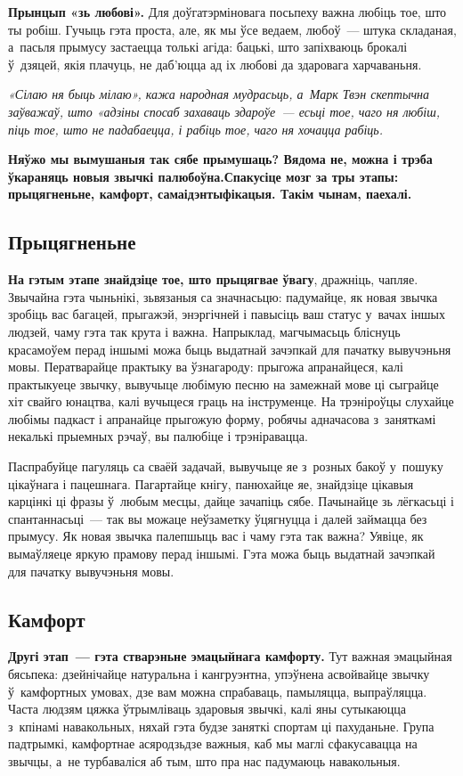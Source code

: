 \textbf{Прынцып «зь любові».} Для доўгатэрміновага посьпеху важна любіць тое, што ты робіш. Гучыць гэта проста, але, як мы ўсе ведаем, любоў~--- штука складаная, а~пасьля прымусу застаецца толькі агіда: бацькі, што запіхваюць брокалі ў~дзяцей, якія плачуць, не даб'юцца ад іх любові да здаровага харчаваньня.

\emph{«Сілаю ня быць мілаю», кажа народная мудрасьць, а~Марк Твэн скептычна заўважаў, што «адзіны спосаб захаваць здароўе~--- есьці тое, чаго ня любіш, піць тое, што не падабаецца, і рабіць тое, чаго ня хочацца рабіць.}

\textbf{Няўжо мы вымушаныя так сябе прымушаць? Вядома не, можна і трэба ўкараняць новыя звычкі палюбоўна.Спакусіце мозг за тры этапы: прыцягненьне, камфорт, самаідэнтыфікацыя. Такім чынам, паехалі.}

\subsection*{Прыцягненьне}

\textbf{На гэтым этапе знайдзіце тое, што прыцягвае ўвагу}, дражніць, чапляе. Звычайна гэта чыньнікі, зьвязаныя са значнасьцю: падумайце, як новая звычка зробіць вас багацей, прыгажэй, энэргічней і павысіць ваш статус у~вачах іншых людзей, чаму гэта так крута і важна. Напрыклад, магчымасьць бліснуць красамоўем перад іншымі можа быць выдатнай зачэпкай для пачатку вывучэньня мовы. Ператварайце практыку ва ўзнагароду: прыгожа апранайцеся, калі практыкуеце звычку, вывучыце любімую песню на замежнай мове ці сыграйце хіт свайго юнацтва, калі вучыцеся граць на інструменце. На трэніроўцы слухайце любімы падкаст і апранайце прыгожую форму, робячы адначасова з~заняткамі некалькі прыемных рэчаў, вы палюбіце і трэніравацца.

Паспрабуйце пагуляць са сваёй задачай, вывучыце яе з~розных бакоў у~пошуку цікаўнага і пацешнага. Пагартайце кнігу, панюхайце яе, знайдзіце цікавыя карцінкі ці фразы ў~любым месцы, дайце зачапіць сябе. Пачынайце зь лёгкасьці і спантаннасьці~--- так вы можаце неўзаметку ўцягнуцца і далей займацца без прымусу. Як новая звычка палепшыць вас і чаму гэта так важна? Уявіце, як вымаўляеце яркую прамову перад іншымі. Гэта можа быць выдатнай зачэпкай для пачатку вывучэньня мовы.

\subsection*{Камфорт}

\textbf{Другі этап~--- гэта стварэньне эмацыйнага камфорту.} Тут важная эмацыйная бясьпека: дзейнічайце натуральна і кангруэнтна, упэўнена асвойвайце звычку ў~камфортных умовах, дзе вам можна спрабаваць, памыляцца, выпраўляцца. Часта людзям цяжка ўтрымліваць здаровыя звычкі, калі яны сутыкаюцца з~кпінамі навакольных, няхай гэта будзе заняткі спортам ці пахуданьне. Група падтрымкі, камфортнае асяродзьдзе важныя, каб мы маглі сфакусавацца на звычцы, а~не турбаваліся аб тым, што пра нас падумаюць навакольныя.


